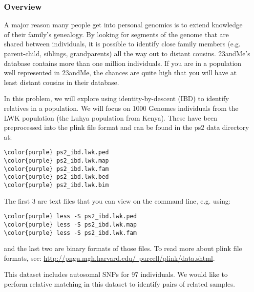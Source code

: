 \documentclass[12pt]{article}
\begin{document}
\subsubsection*{Overview}

A major reason many people get into personal genomics is to extend knowledge of their family's genealogy. By looking for segments of the genome that are shared between individuals, it is possible to identify close family members (e.g. parent-child, siblings, grandparents) all the way out to distant cousins. 23andMe's database contains more than one million individuals. If you are in a population well represented in 23andMe, the chances are quite high that you will have at least distant cousins in their database.

In this problem, we will explore using identity-by-descent (IBD) to identify relatives in a population. We will focus on 1000 Genomes individuals from the LWK population (the Luhya population from Kenya). These have been preprocessed into the plink file format and can be found in the ps2 data directory at:

\begin{Verbatim}[commandchars=\\\{\}]
\color{purple} ps2_ibd.lwk.ped
\color{purple} ps2_ibd.lwk.map
\color{purple} ps2_ibd.lwk.fam
\color{purple} ps2_ibd.lwk.bed
\color{purple} ps2_ibd.lwk.bim
\end{Verbatim}

The first 3 are text files that you can view on the command line, e.g. using:
\begin{Verbatim}[commandchars=\\\{\}]
\color{purple} less -S ps2_ibd.lwk.ped
\color{purple} less -S ps2_ibd.lwk.map
\color{purple} less -S ps2_ibd.lwk.fam
\end{Verbatim}

and the last two are binary formats of those files. To read more about plink file formats, see: \href{http://pngu.mgh.harvard.edu/~purcell/plink/data.shtml}{http://pngu.mgh.harvard.edu/~purcell/plink/data.shtml}.

This dataset includes autosomal SNPs for 97 individuals. We would like to perform relative matching in this dataset to identify pairs of related samples.
\end{document}
